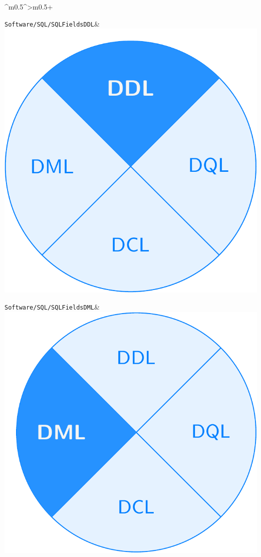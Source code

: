 \documentclass[PLAIN]{Lilly}
\begin{document}
\begin{tabularx}{\linewidth}{^m{0.5\linewidth}^>{\centering\arraybackslash}m{0.5\linewidth}+}
\midrule {} {}\verb|Software/SQL/SQLFieldsDDL|& \includegraphics[width=0.8\linewidth]{Software/SQL/SQLFieldsDDL-pdf.pdf}\\
\midrule {} {}\verb|Software/SQL/SQLFieldsDML|& \includegraphics[width=0.8\linewidth]{Software/SQL/SQLFieldsDML-pdf.pdf}\\

\end{tabularx}
\end{document}
